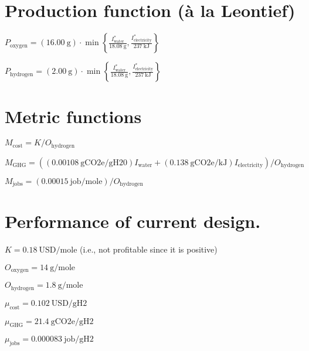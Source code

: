 \documentclass[letterpaper,10pt,english]{sphinxmanual}
\begin{document}
\section{Production function (à la Leontief)}
\label{\detokenize{example-technology:production-function-a-la-leontief}}
\sphinxAtStartPar
\(P_\mathrm{oxygen} = \left( 16.00~\mathrm{g} \right) \cdot \min \left\{ \frac{I^*_\mathrm{water}}{18.08~\mathrm{g}}, \frac{I^*_\mathrm{electricity}}{237~\mathrm{kJ}} \right\}\)

\sphinxAtStartPar
\(P_\mathrm{hydrogen} = \left( 2.00~\mathrm{g} \right) \cdot \min \left\{ \frac{I^*_\mathrm{water}}{18.08~\mathrm{g}}, \frac{I^*_\mathrm{electricity}}{237~\mathrm{kJ}} \right\}\)


\section{Metric functions}
\label{\detokenize{example-technology:metric-functions}}
\sphinxAtStartPar
\(M_\mathrm{cost} = K / O_\mathrm{hydrogen}\)

\sphinxAtStartPar
\(M_\mathrm{GHG} = \left( \left( 0.00108~\mathrm{gCO2e/gH20} \right) I_\mathrm{water} + \left( 0.138~\mathrm{gCO2e/kJ} \right) I_\mathrm{electricity} \right) / O_\mathrm{hydrogen}\)

\sphinxAtStartPar
\(M_\mathrm{jobs} = \left( 0.00015~\mathrm{job/mole} \right) / O_\mathrm{hydrogen}\)


\section{Performance of current design.}
\label{\detokenize{example-technology:performance-of-current-design}}
\sphinxAtStartPar
\(K = 0.18~\mathrm{USD/mole}\) (i.e., not profitable since it is
positive)

\sphinxAtStartPar
\(O_\mathrm{oxygen} = 14~\mathrm{g/mole}\)

\sphinxAtStartPar
\(O_\mathrm{hydrogen} = 1.8~\mathrm{g/mole}\)

\sphinxAtStartPar
\(\mu_\mathrm{cost} = 0.102~\mathrm{USD/gH2}\)

\sphinxAtStartPar
\(\mu_\mathrm{GHG} = 21.4~\mathrm{gCO2e/gH2}\)

\sphinxAtStartPar
\(\mu_\mathrm{jobs} = 0.000083~\mathrm{job/gH2}\)
\end{document}
